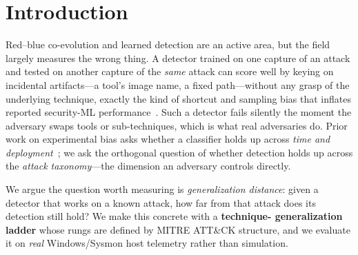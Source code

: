 \documentclass[sigconf,nonacm]{acmart}
\begin{document}
\maketitle

\section{Introduction}
\label{sec:intro}
Red--blue co-evolution and learned detection are an active area, but the field
largely measures the wrong thing. A detector trained on one capture of an attack
and tested on another capture of the \emph{same} attack can score well by keying
on incidental artifacts---a tool's image name, a fixed path---without any grasp
of the underlying technique, exactly the kind of shortcut and sampling bias that
inflates reported security-ML performance~\cite{arp2022,tesseract}. Such a
detector fails silently the moment the adversary swaps tools or sub-techniques,
which is what real adversaries do. Prior work on experimental bias asks whether
a classifier holds up across \emph{time and deployment}~\cite{tesseract}; we ask
the orthogonal question of whether detection holds up across the \emph{attack
taxonomy}---the dimension an adversary controls directly.

We argue the question worth measuring is \emph{generalization distance}: given a
detector that works on a known attack, how far from that attack does its
detection still hold? We make this concrete with a \textbf{technique-%
generalization ladder} whose rungs are defined by MITRE ATT\&CK structure, and
we evaluate it on \emph{real} Windows/Sysmon host telemetry rather than
simulation.
\end{document}
